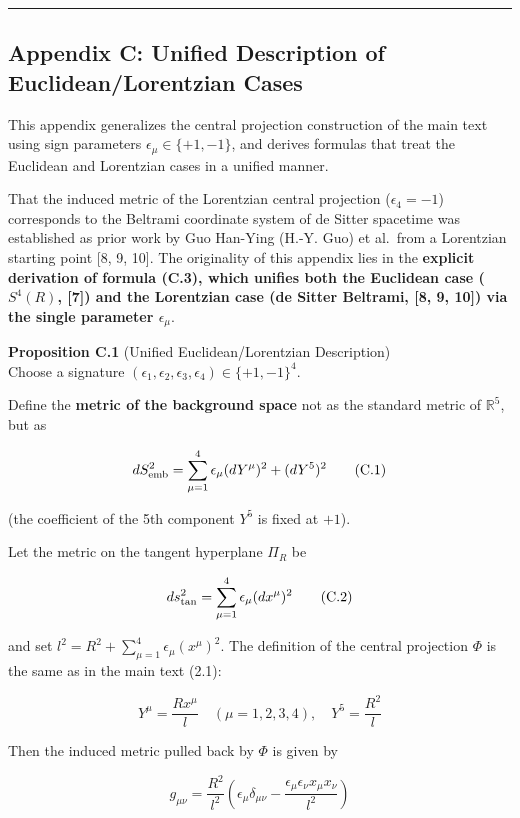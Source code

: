 \documentclass[a4paper,11pt]{article}
\theoremstyle{definition}
\begin{document}
\begin{center}\rule{0.5\linewidth}{0.5pt}\end{center}

\subsection{Appendix C: Unified Description of Euclidean/Lorentzian Cases}\label{appendix-c-unified-description-of-euclideanlorentzian-cases}

This appendix generalizes the central projection construction of the main text using sign parameters \(\epsilon_\mu \in \{+1,-1\}\), and derives formulas that treat the Euclidean and Lorentzian cases in a unified manner.

That the induced metric of the Lorentzian central projection (\(\epsilon_4 = -1\)) corresponds to the Beltrami coordinate system of de Sitter spacetime was established as prior work by Guo Han-Ying (H.-Y. Guo) et al.~from a Lorentzian starting point {[}8, 9, 10{]}. The originality of this appendix lies in the \textbf{explicit derivation of formula (C.3), which unifies both the Euclidean case (\(S^4(R)\), {[}7{]}) and the Lorentzian case (de Sitter Beltrami, {[}8, 9, 10{]}) via the single parameter \(\epsilon_\mu\)}.

\textbf{Proposition C.1} (Unified Euclidean/Lorentzian Description)\\
Choose a signature \((\epsilon_1, \epsilon_2, \epsilon_3, \epsilon_4) \in \{+1,-1\}^4\).

Define the \textbf{metric of the background space} not as the standard metric of \(\mathbb{R}^5\), but as

\[dS^2_{\rm emb} = \sum_{\mu=1}^{4} \epsilon_\mu (dY^\mu)^2 + (dY^5)^2 \tag{C.1}\]

(the coefficient of the 5th component \(Y^5\) is fixed at \(+1\)).

Let the metric on the tangent hyperplane \(\Pi_R\) be

\[ds^2_{\rm tan} = \sum_{\mu=1}^{4} \epsilon_\mu (dx^\mu)^2 \tag{C.2}\]

and set \(l^2 = R^2 + \sum_{\mu=1}^4 \epsilon_\mu (x^\mu)^2\). The definition of the central projection \(\Phi\) is the same as in the main text (2.1):

\[Y^\mu = \frac{R x^\mu}{l} \quad (\mu=1,2,3,4), \quad Y^5 = \frac{R^2}{l}\]

Then the induced metric pulled back by \(\Phi\) is given by

\[g_{\mu\nu} = \frac{R^2}{l^2}\left(\epsilon_\mu \delta_{\mu\nu} - \frac{\epsilon_\mu \epsilon_\nu x_\mu x_\nu}{l^2}\right) \tag{C.3}\]
\end{document}
